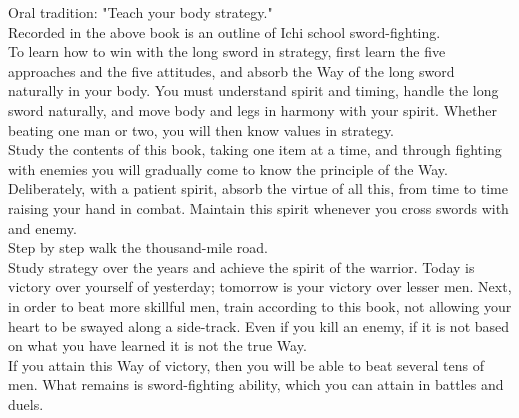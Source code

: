 Oral tradition: "Teach your body strategy."\\

Recorded in the above book is an outline of Ichi school sword-fighting.\\

To learn how to win with the long sword in strategy, first learn the five approaches and the five attitudes, and absorb the Way of the long sword naturally in your body. You must understand spirit and timing, handle the long sword naturally, and move body and legs in harmony with your spirit. Whether beating one man or two, you will then know values in strategy.\\

Study the contents of this book, taking one item at a time, and through fighting with enemies you will gradually come to know the principle of the Way.\\

Deliberately, with a patient spirit, absorb the virtue of all this, from time to time raising your hand in combat. Maintain this spirit whenever you cross swords with and enemy.\\

Step by step walk the thousand-mile road.\\

Study strategy over the years and achieve the spirit of the warrior. Today is victory over yourself of yesterday; tomorrow is your victory over lesser men. Next, in order to beat more skillful men, train according to this book, not allowing your heart to be swayed along a side-track. Even if you kill an enemy, if it is not based on what you have learned it is not the true Way.\\

If you attain this Way of victory, then you will be able to beat several tens of men. What remains is sword-fighting ability, which you can attain in battles and duels. 
